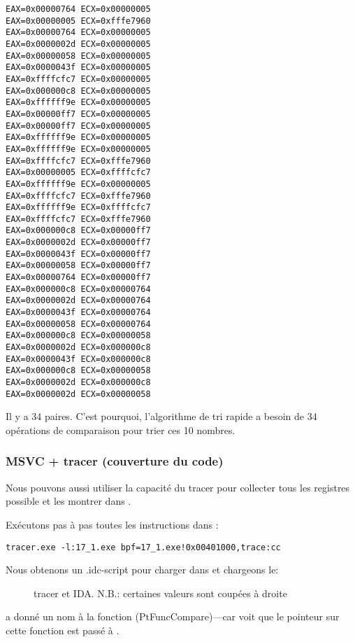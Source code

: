 \begin{lstlisting}
EAX=0x00000764 ECX=0x00000005
EAX=0x00000005 ECX=0xfffe7960
EAX=0x00000764 ECX=0x00000005
EAX=0x0000002d ECX=0x00000005
EAX=0x00000058 ECX=0x00000005
EAX=0x0000043f ECX=0x00000005
EAX=0xffffcfc7 ECX=0x00000005
EAX=0x000000c8 ECX=0x00000005
EAX=0xffffff9e ECX=0x00000005
EAX=0x00000ff7 ECX=0x00000005
EAX=0x00000ff7 ECX=0x00000005
EAX=0xffffff9e ECX=0x00000005
EAX=0xffffff9e ECX=0x00000005
EAX=0xffffcfc7 ECX=0xfffe7960
EAX=0x00000005 ECX=0xffffcfc7
EAX=0xffffff9e ECX=0x00000005
EAX=0xffffcfc7 ECX=0xfffe7960
EAX=0xffffff9e ECX=0xffffcfc7
EAX=0xffffcfc7 ECX=0xfffe7960
EAX=0x000000c8 ECX=0x00000ff7
EAX=0x0000002d ECX=0x00000ff7
EAX=0x0000043f ECX=0x00000ff7
EAX=0x00000058 ECX=0x00000ff7
EAX=0x00000764 ECX=0x00000ff7
EAX=0x000000c8 ECX=0x00000764
EAX=0x0000002d ECX=0x00000764
EAX=0x0000043f ECX=0x00000764
EAX=0x00000058 ECX=0x00000764
EAX=0x000000c8 ECX=0x00000058
EAX=0x0000002d ECX=0x000000c8
EAX=0x0000043f ECX=0x000000c8
EAX=0x000000c8 ECX=0x00000058
EAX=0x0000002d ECX=0x000000c8
EAX=0x0000002d ECX=0x00000058
\end{lstlisting}

Il y a 34 paires.
C'est pourquoi, l'algorithme de tri rapide a besoin de 34 opérations de comparaison
pour trier ces 10 nombres.

\clearpage
\subsubsection{MSVC + tracer (couverture du code)}

Nous pouvons aussi utiliser la capacité du tracer pour collecter tous les registres
possible et les montrer dans \IDA.

Exécutons pas à pas toutes les instructions dans \comp:

\begin{lstlisting}
tracer.exe -l:17_1.exe bpf=17_1.exe!0x00401000,trace:cc
\end{lstlisting}

Nous obtenons un .idc-script pour charger dans \IDA et chargeons le:

\begin{figure}[H]
\centering
{}
\caption{tracer et IDA. N.B.: 
certaines valeurs sont coupées à droite}
\label{fig:qsort_tracer_cc}
\end{figure}

\IDA a donné un nom à la fonction (PtFuncCompare)---car \IDA voit que le pointeur sur
cette fonction est passé à \qsort.

